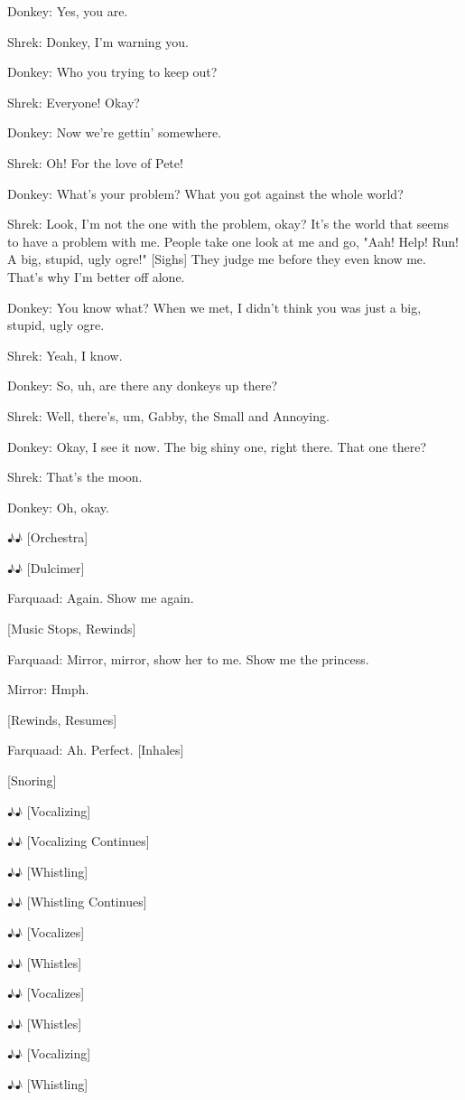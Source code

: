 \documentclass{article}
\begin{document}
Donkey:
Yes, you are.

Shrek:
Donkey, I'm warning you.

Donkey:
Who you trying to keep out?

Shrek:
Everyone! Okay?

Donkey:
Now we're gettin' somewhere.

Shrek:
Oh! For the love of Pete!

Donkey:
What's your problem? What you got against the whole world?

Shrek:
Look, I'm not the one with the problem, okay? It's the world that seems to have a problem with me. People take one look at me and go, "Aah! Help! Run! A big, stupid, ugly ogre!" [Sighs] They judge me before they even know me. That's why I'm better off alone.

Donkey:
You know what? When we met, I didn't think you was just a big, stupid, ugly ogre.

Shrek:
Yeah, I know.

Donkey:
So, uh, are there any donkeys up there?

Shrek:
Well, there's, um, Gabby, the Small and Annoying.

Donkey:
Okay, I see it now. The big shiny one, right there. That one there?

Shrek:
That's the moon.

Donkey:
Oh, okay.

♪♪ [Orchestra]

♪♪ [Dulcimer]

Farquaad:
Again. Show me again.

[Music Stops, Rewinds]

Farquaad:
Mirror, mirror, show her to me. Show me the princess.

Mirror:
Hmph.

[Rewinds, Resumes]

Farquaad:
Ah. Perfect. [Inhales]

[Snoring]

♪♪ [Vocalizing]

♪♪ [Vocalizing Continues]

♪♪ [Whistling]

♪♪ [Whistling Continues]

♪♪ [Vocalizes]

♪♪ [Whistles]

♪♪ [Vocalizes]

♪♪ [Whistles]

♪♪ [Vocalizing]

♪♪ [Whistling]
\end{document}
